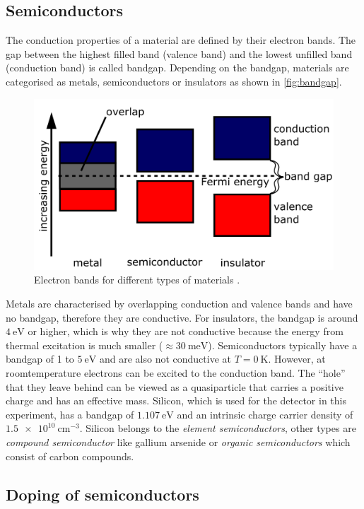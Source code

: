 \subsection{Semiconductors}
\label{subsec:Semiconductors}
The conduction properties of a material are defined by their electron bands. The gap between the highest filled band (valence band) and the lowest unfilled band (conduction band)
is called bandgap. Depending on the bandgap, materials are categorised as metals, semiconductors or insulators as shown in \autoref{fig:bandgap}.
\begin{figure}
    \centering 
    \includegraphics[width = .6\textwidth]{content/pics/Band_gap.png}
    \caption{Electron bands for different types of materials \cite{Bandgap}.}
    \label{fig:bandgap}
\end{figure}
Metals are characterised by overlapping conduction and valence bands and have no bandgap, therefore they are conductive. 
For insulators, the bandgap is around $\qty{4}{\eV}$ or higher, which is why they are not conductive because the energy from thermal excitation 
is much smaller ($\approx\qty{30}{\milli\eV}$). Semiconductors typically have a bandgap of 1 to $\qty{5}{\eV}$ and are also not conductive at 
$T = \qty{0}{\kelvin}$. However, at roomtemperature electrons can be excited to the conduction band. The \enquote{hole} that they leave behind can be viewed as a quasiparticle that 
carries a positive charge and has an effective mass. Silicon, which is used for the detector in this experiment, has a bandgap of $\qty{1.107}{\eV}$ and an intrinsic charge 
carrier density of $\qty{1.5e10}{\centi\metre^{-3}}$. Silicon belongs to the \textit{element semiconductors}, other types are \textit{compound semiconductor} 
like gallium arsenide or \textit{organic semiconductors} which consist of carbon compounds.

\subsection{Doping of semiconductors}

